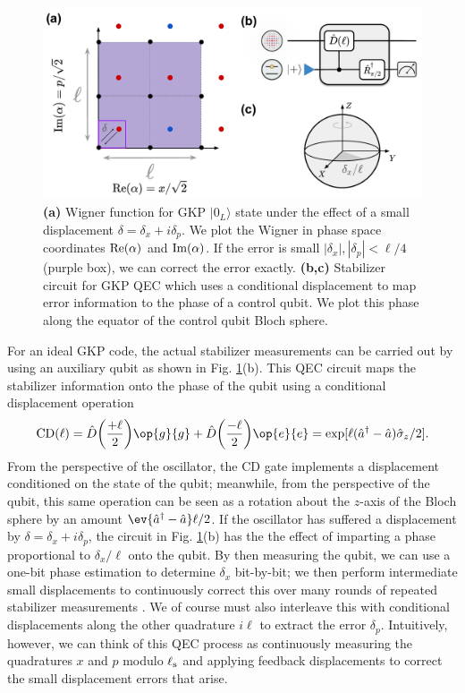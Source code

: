 \begin{figure}[h]
    \centering
    \includegraphics[width=0.85\linewidth]{Figures/2/GKP Ideal QEC.pdf}
    \caption{\textbf{(a)} Wigner function for GKP $|0_L\rangle$ state under the effect of a small displacement $\delta = \delta_x + i\delta_p$. We plot the Wigner in phase space coordinates ${\rm Re}(\alpha)$ and ${\rm Im}(\alpha)$. If the error is small $|\delta_x|, |\delta_p| < \ell / 4$ (purple box), we can correct the error exactly. \textbf{(b,c)} Stabilizer circuit for GKP QEC which uses a conditional displacement to map error information to the phase of a control qubit. We plot this phase along the equator of the control qubit Bloch sphere.}
    \label{fig:2-GKP-Ideal-QEC}
\end{figure}

For an ideal GKP code, the actual stabilizer measurements can be carried out by using an auxiliary qubit as shown in Fig. \ref{fig:2-GKP-Ideal-QEC}(b). This QEC circuit maps the stabilizer information onto the phase of the qubit using a conditional displacement operation
\begin{equation}
    {\rm CD}(\ell) = \hat{D}\bigg(\frac{+\ell}{2}\bigg)\op{g}{g} + \hat{D}\bigg(\frac{-\ell}{2}\bigg)\op{e}{e} = \exp[\ell(\hat{a}^\dagger - \hat{a}) \sigmaz / 2].
    \label{eq:2_CD_unitary_definition}
\end{equation}
From the perspective of the oscillator, the CD gate implements a displacement conditioned on the state of the qubit; meanwhile, from the perspective of the qubit, this same operation can be seen as a rotation about the $z$-axis of the Bloch sphere by an amount $\ev{\hat{a}^\dagger - \hat{a}}\ell/2$. If the oscillator has suffered a displacement by $\delta = \delta_x + i\delta_p$, the circuit in Fig. \ref{fig:2-GKP-Ideal-QEC}(b) has the the effect of imparting a phase proportional to $\delta_x/\ell$ onto the qubit. By then measuring the qubit, we can use a one-bit phase estimation to determine $\delta_x$ bit-by-bit; we then perform intermediate small displacements to continuously correct this over many rounds of repeated stabilizer measurements \cite{terhal2016phase-estimation, terhal2020bosonic}. We of course must also interleave this with conditional displacements along the other quadrature $i\ell$ to extract the error $\delta_p$. Intuitively, however, we can think of this QEC process as continuously measuring the quadratures $x$ and $p$ modulo $\ell_{\rm s}$ and applying feedback displacements to correct the small displacement errors that arise. 


